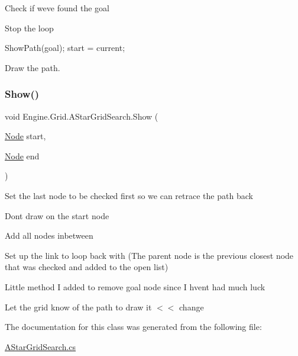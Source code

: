 Check if we\textquotesingle{}ve found the goal

Stop the loop

Show\+Path(goal); start = current;

Draw the path. \mbox{\label{a00398_a0376f68fb9f4d45d11be4855fece5e56}} 
\subsubsection{\texorpdfstring{Show()}{Show()}}
{\footnotesize\ttfamily void Engine.\+Grid.\+A\+Star\+Grid\+Search.\+Show (\begin{DoxyParamCaption}\item[{\hyperlink{a00414}{Node}}]{start,  }\item[{\hyperlink{a00414}{Node}}]{end }\end{DoxyParamCaption})\hspace{0.3cm}{\ttfamily [inline]}}

Set the last node to be checked first so we can retrace the path back

Dont draw on the start node

Add all nodes inbetween

Set up the link to loop back with (The parent node is the previous closest node that was checked and added to the open list)

Little method I added to remove goal node since I hvent had much luck

Let the grid know of the path to draw it $<$$<$ change 

The documentation for this class was generated from the following file\+:\begin{DoxyCompactItemize}
\item 
\hyperlink{a00080}{A\+Star\+Grid\+Search.\+cs}\end{DoxyCompactItemize}
